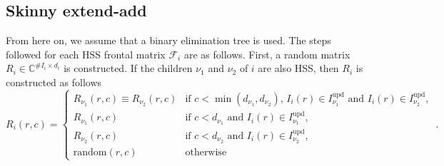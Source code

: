 \documentclass{article}
\begin{document}
\subsection{Skinny extend-add}\label{sec:skinny-extend-add}
From here on, we assume that a binary elimination tree is used. The
steps followed for each HSS frontal matrix $\mathcal{F}_i$ are as
follows. First, a random matrix $R_i \in \mathbb{C}^{\#I_i \times
  d_i}$ is constructed. If the children $\nu_1$ and $\nu_2$ of $i$ are
also HSS, then $R_i$ is constructed as follows
\begin{equation}\label{eq:Rmerge}
  R_i(r,c) = 
  \begin{cases}
    R_{\nu_1}(r,c) \equiv R_{\nu_2}(r,c) & \textrm{if } c < \min(d_{\nu_1},d_{\nu_2}), \, I_i(r) \in I^{\mathrm{upd}}_{\nu_1} \textrm{ and } I_i(r) \in I^{\mathrm{upd}}_{\nu_2}, \\
    R_{\nu_1}(r,c) & \textrm{if } c < d_{\nu_1} \textrm{ and } I_i(r) \in I^{\mathrm{upd}}_{\nu_1}, \\
    R_{\nu_2}(r,c) & \textrm{if } c < d_{\nu_2} \textrm{ and } I_i(r) \in I^{\mathrm{upd}}_{\nu_2}, \\
    \textrm{random}(r,c) & \textrm{otherwise}
  \end{cases} \, .
\end{equation}
\end{document}
